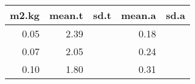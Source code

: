 \begin{table}[ht]
\centering
\begin{tabular}{rrrrr}
  \hline
m2.kg & mean.t & sd.t & mean.a & sd.a \\ 
  \hline
0.05 & 2.39 &  & 0.18 &  \\ 
  0.07 & 2.05 &  & 0.24 &  \\ 
  0.10 & 1.80 &  & 0.31 &  \\ 
   \hline
\end{tabular}
\end{table}
